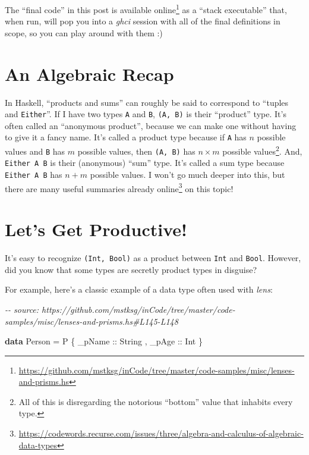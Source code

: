 \documentclass[]{article}
\newenvironment{Shaded}{}{}
\newcommand{\CommentTok}[1]{\textcolor[rgb]{0.38,0.63,0.69}{\textit{#1}}}
\newcommand{\DataTypeTok}[1]{\textcolor[rgb]{0.56,0.13,0.00}{#1}}
\newcommand{\KeywordTok}[1]{\textcolor[rgb]{0.00,0.44,0.13}{\textbf{#1}}}
\newcommand{\NormalTok}[1]{#1}
\newcommand{\OtherTok}[1]{\textcolor[rgb]{0.00,0.44,0.13}{#1}}
\renewcommand{\href}[2]{#2\footnote{\url{#1}}}
\begin{document}
The ``final code'' in this post is
\href{https://github.com/mstksg/inCode/tree/master/code-samples/misc/lenses-and-prisms.hs}{available
online} as a ``stack executable'' that, when run, will pop you into a
\emph{ghci} session with all of the final definitions in scope, so you can play
around with them :)

\section{An Algebraic Recap}\label{an-algebraic-recap}

In Haskell, ``products and sums'' can roughly be said to correspond to ``tuples
and \texttt{Either}''. If I have two types \texttt{A} and \texttt{B},
\texttt{(A,\ B)} is their ``product'' type. It's often called an ``anonymous
product'', because we can make one without having to give it a fancy name. It's
called a product type because if \texttt{A} has \(n\) possible values and
\texttt{B} has \(m\) possible values, then \texttt{(A,\ B)} has \(n \times m\)
possible values\footnote{All of this is disregarding the notorious ``bottom''
  value that inhabits every type.}. And, \texttt{Either\ A\ B} is their
(anonymous) ``sum'' type. It's called a sum type because \texttt{Either\ A\ B}
has \(n + m\) possible values. I won't go much deeper into this, but there are
\href{https://codewords.recurse.com/issues/three/algebra-and-calculus-of-algebraic-data-types}{many
useful summaries already online} on this topic!

\section{Let's Get Productive!}\label{lets-get-productive}

It's easy to recognize \texttt{(Int,\ Bool)} as a product between \texttt{Int}
and \texttt{Bool}. However, did you know that some types are secretly product
types in disguise?

For example, here's a classic example of a data type often used with
\emph{lens}:

\begin{Shaded}
\begin{Highlighting}[]
\CommentTok{{-}{-} source: https://github.com/mstksg/inCode/tree/master/code{-}samples/misc/lenses{-}and{-}prisms.hs\#L145{-}L148}

\KeywordTok{data} \DataTypeTok{Person} \OtherTok{=} \DataTypeTok{P}
\NormalTok{    \{}\OtherTok{ \_pName ::} \DataTypeTok{String}
\NormalTok{    ,}\OtherTok{ \_pAge  ::} \DataTypeTok{Int}
\NormalTok{    \}}
\end{Highlighting}
\end{Shaded}
\end{document}
